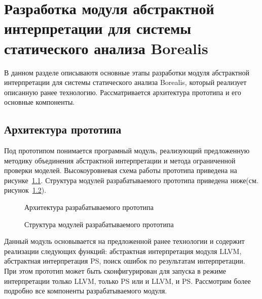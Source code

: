 \chapter{Разработка модуля абстрактной интерпретации для системы статического
анализа Borealis}
\label{chapter:implementation}
В данном разделе описываютя основные этапы разработки модуля абстрактной 
интерпретации для системы статического анализа Borealis, который реализует
описанную ранее технологию. Рассматривается архитектура прототипа и его
основные компоненты.

\section{Архитектура прототипа}
Под прототипом понимается програмный модуль, реализующий предложенную методику
объединения абстрактной интерпретации и метода ограниченной проверки моделей.
Высокоуровневая схема работы прототипа приведена на 
рисунке~\ref{image:NewBorealisOverview}. Структура модулей разрабатываемого прототипа приведена ниже(см. рисунок~\ref{image:prototypeArchitecture}).
\begin{figure}[h!]
\caption{Архитектура разрабатываемого прототипа}
\label{image:NewBorealisOverview}
\end{figure}
\begin{figure}[h!]
\caption{Структура модулей разрабатываемого прототипа}
\label{image:prototypeArchitecture}
\end{figure}

Данный модуль основывается на предложенной ранее технологии и содержит 
реализации следующих функций: абстрактная интерпретация модуля LLVM, 
абстрактная интерпретация PS, поиск ошибок по результатам интерпретации. 
При этом прототип может быть сконфигурирован для запуска в режиме интерпретации
только LLVM, только PS или и LLVM, и PS. Рассмотрим более подробно все 
компоненты разрабатываемого модуля.

